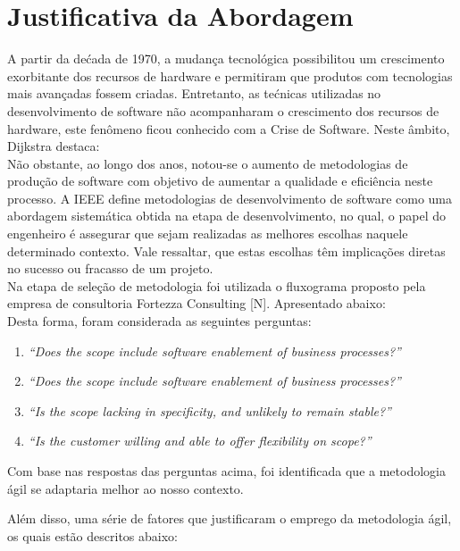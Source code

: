 \section{Justificativa da Abordagem}
\label{sec:nova_sess_o}

\tab A partir da dećada de 1970, a mudança tecnológica  possibilitou um crescimento exorbitante dos recursos de hardware e permitiram que produtos com tecnologias mais avançadas fossem criadas. Entretanto, as tećnicas utilizadas no desenvolvimento  de software não acompanharam o crescimento dos recursos de hardware, este fenômeno ficou conhecido com a Crise de Software. Neste âmbito, Dijkstra destaca:\\


\tab Não obstante,  ao longo dos anos, notou-se o aumento de metodologias de produção de software com objetivo de aumentar a qualidade e eficiência neste processo. A IEEE define metodologias de desenvolvimento de software como uma abordagem sistemática obtida na etapa de desenvolvimento, no qual, o papel do engenheiro é assegurar que sejam realizadas as melhores escolhas naquele determinado contexto. Vale ressaltar, que estas escolhas têm implicações diretas no sucesso ou fracasso de um projeto.\\

\tab Na etapa de seleção de metodologia foi utilizada o fluxograma proposto pela empresa de consultoria Fortezza Consulting [N]. Apresentado abaixo: \\ 

\tab Desta forma, foram considerada as seguintes perguntas: \\

\begin{enumerate}
	\item \textsl{“Does the scope include software enablement of business processes?”} 
	\item \textsl{“Does the scope include software enablement of business processes?”}
	\item \textsl{“Is the scope lacking in specificity, and unlikely to remain stable?”} 
	\item \textsl{“Is the customer willing and able to offer flexibility on scope?”} 
\end{enumerate}

\tab Com base nas respostas das perguntas acima, foi identificada que a metodologia ágil se adaptaria melhor ao nosso contexto.  

\tab Além disso, uma série de fatores que justificaram o emprego da metodologia ágil, os quais estão descritos abaixo:

